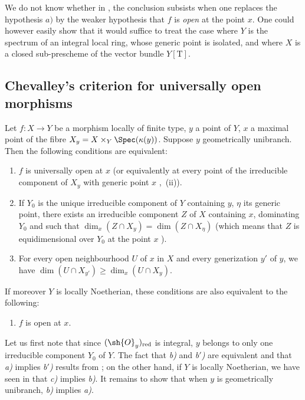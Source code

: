 \begin{remark}[14.3.14]
\label{IV.14.3.14}
We do not know whether in , the conclusion subsists when one replaces the hypothesis $a)$ by the weaker hypothesis that $f$ is \emph{open} at the point $x$.
One could however easily show that it would suffice to treat the case where $Y$ is the spectrum of an integral local ring, whose generic point is isolated, and where $X$ is a closed sub-prescheme of the vector bundle $Y[\mathrm{T}]$.
\end{remark}
\subsection{Chevalley's criterion for universally open morphisms}
\label{subsection:IV.14.4}

\begin{theorem}[14.4.1]
\label{IV.14.4.1}
Let $f:X\to Y$ be a morphism locally of finite type, $y$ a point of $Y$, $x$ a maximal point of the fibre $X_y=X\times_Y\Spec(\kappa(y))$.
Suppose $y$ geometrically unibranch.
Then the following conditions are equivalent:
\begin{enumerate}[label=\emph{\alph*)}]
  \item $f$ is universally open at $x$ (or equivalently at every point of the irreducible component of $X_y$ with generic point $x$ ,~(ii)).
  \item If $Y_0$ is the unique irreducible component of $Y$ containing $y$, $\eta$ its generic point, there exists an irreducible component $Z$ of $X$ containing $x$, dominating $Y_0$ and such that $\dim_x(Z\cap X_y)=\dim(Z\cap X_\eta)$ (which means that $Z$ is equidimensional over $Y_0$ at the point $x$ ).
  \item[\emph{b$'$)}] For every open neighbourhood $U$ of $x$ in $X$ and every generization $y'$ of $y$, we have $\dim(U\cap X_{y'})\geq\dim_x(U\cap X_y)$.
\end{enumerate}
If moreover $Y$ is locally Noetherian, these conditions are also equivalent to the following:
\begin{enumerate}[label=\emph{\alph*)}]
  \item[\emph{c)}] $f$ is open at $x$.
\end{enumerate}
\end{theorem}

Let us first note that since $(\sh{O}_y)_{\mathrm{red}}$ is integral, $y$ belongs to only one irreducible component $Y_0$ of $Y$.
The fact that \emph{b)} and \emph{b$'$)} are equivalent and that \emph{a)} implies \emph{b$'$)} results from ; on the other hand, if $Y$ is locally Noetherian, we have seen in  that \emph{c)} implies \emph{b)}.
It remains to show that when $y$ is geometrically unibranch, \emph{b)} implies \emph{a)}.

